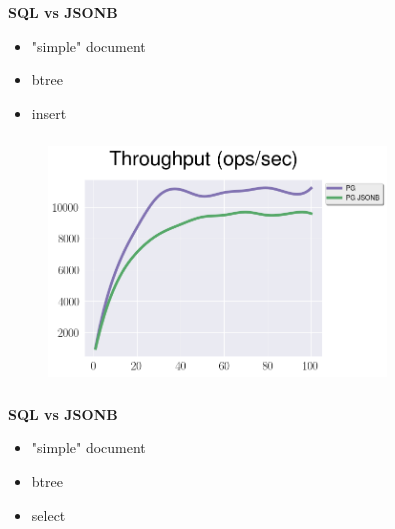 \documentclass[usenames,dvipsnames, 18pt, compress, aspectratio=169]{beamer}
\begin{document}
\begin{frame}
    \frametitle{}
    \begin{center}
        \textbf{SQL vs JSONB}
        \begin{itemize}[label={}]
            \item "simple" document
            \item btree
            \item insert
        \end{itemize}
    \end{center}
\end{frame}

\begin{frame}
    \frametitle{}
    \begin{center}
    \vspace{10pt}
    \begin{figure}
        \includegraphics[width=0.8\textwidth,center]{benchmarks/postgresql_load_jsonb_jdbc.png}
    \end{figure}
    \end{center}
\end{frame}

\begin{frame}
    \frametitle{}
    \begin{center}
        \textbf{SQL vs JSONB}
        \begin{itemize}[label={}]
            \item "simple" document
            \item btree
            \item select
        \end{itemize}
    \end{center}
\end{frame}
\end{document}
